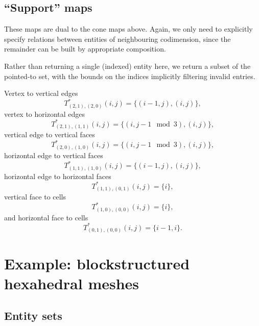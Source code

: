 \documentclass[a4paper,11pt]{article}
\begin{document}
\subsection{``Support'' maps}
\label{sec:support-maps}
These maps are dual to the cone maps above. Again, we only need to
explicitly specify relations between entities of neighbouring
codimension, since the remainder can be built by appropriate
composition.

Rather than returning a single (indexed) entity here, we return a
subset of the pointed-to set, with the bounds on the indices
implicitly filtering invalid entries.

Vertex to vertical edges
\begin{equation}
  \label{eq:17}
  T^*_{(2,1),(2,0)}(i, j) = \{(i-1, j), (i, j)\},
\end{equation}
vertex to horizontal edges
\begin{equation}
  \label{eq:18}
  T^*_{(2,1), (1, 1)}(i, j) = \{(i, j-1 \mod 3), (i, j)\},
\end{equation}
vertical edge to vertical faces
\begin{equation}
  \label{eq:19}
  T^*_{(2, 0), (1, 0)}(i, j) = \{(i, j - 1 \mod 3), (i, j)\},
\end{equation}
horizontal edge to vertical faces
\begin{equation}
  \label{eq:20}
  T^*_{(1, 1), (1, 0)}(i, j) = \{(i - 1, j), (i, j)\},
\end{equation}
horizontal edge to horizontal faces
\begin{equation}
  \label{eq:20}
  T^*_{(1, 1), (0, 1)}(i, j) = \{i\},
\end{equation}
vertical face to cells
\begin{equation}
  \label{eq:21}
  T^*_{(1, 0), (0, 0)}(i, j) = \{i\},
\end{equation}
and horizontal face to cells
\begin{equation}
  \label{eq:22}
  T^*_{(0, 1), (0, 0)}(i, j) = \{i-1, i\}.
\end{equation}

\section{Example: blockstructured hexahedral meshes}
\label{sec:exampl-block-mesh}

\subsection{Entity sets}
\label{sec:block-entity-sets}
\end{document}
